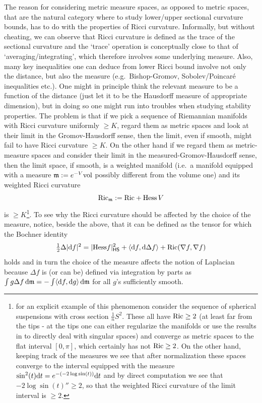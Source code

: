 \documentclass[11pt]{article}
\numberwithin{equation}{section}
\newcommand{\mm}{{\mathfrak m}}
\newcommand{\vol}{{\rm vol}}								%
\renewcommand{\d}{{\rm d}}
\newcommand{\Hess}{{\rm Hess}}
\newcommand\la{\langle}
\newcommand\ra{\rangle}
\newcommand{\HS}{\sf HS}
\newcommand{\Ric}{{\rm Ric}}
\begin{document}
The reason for considering metric measure spaces, as opposed to  metric spaces, that are the natural category where to study lower/upper sectional curvature bounds, has to do with the properties of Ricci curvature. Informally, but without cheating, we can observe that Ricci curvature is defined as the trace of the sectional curvature and the `trace' operation is conceptually close to that of `averaging/integrating', which therefore involves some underlying measure. Also, many key inequalities one can deduce from lower Ricci bound involve not only the distance, but also the measure (e.g.\ Bishop-Gromov, Sobolev/Poincar\'e inequalities etc.). One might in principle think the relevant measure to be a function of the distance (just let it to be the Hausdorff measure of appropriate dimension), but in doing so one might run into troubles when studying stability properties. The problem is that if we pick a sequence of Riemannian manifolds with Ricci curvature uniformly $\geq K$, regard them as metric spaces and look at their limit in the Gromov-Hausdorff sense, then the limit, even if smooth, might fail to have Ricci curvature  $\geq K$. On the other hand if we regard them as metric-measure spaces and consider their limit in the measured-Gromov-Hausdorff sense, then the limit space, if smooth, is a weighted manifold (i.e.\ a manifold equipped with a measure $\mm:=e^{-V}\vol$ possibly different from the volume one) and its weighted Ricci curvature
\begin{equation}
\label{eq:BEricci}
\Ric_\mm:=\Ric+\Hess\, V
\end{equation}
is  $\geq K$\footnote{for an explicit example of this phenomenon consider the sequence of spherical suspensions with cross section $\tfrac1n S^2$. These all have $\Ric\geq 2$ (at least far from the tips - at the tips one can either regularize the manifolds or use the results in \cite{Ketterer13} to directly deal with singular spaces) and converge as metric spaces to the flat interval $[0,\pi]$, which certainly has not $\Ric\geq 2$. On the other hand, keeping track of the measures we see that after normalization these spaces converge to the interval equipped with the measure   $\sin^2(t)\d t=e^{-(-2\log\sin(t))}\d t$ and by direct computation we see that $-2\log\sin(t)''\geq 2$, so that the weighted Ricci curvature of the limit interval is $\geq 2$.}. To see why the Ricci curvature should be affected by the choice of the measure, notice, beside the above, that it can be defined as the tensor for which the Bochner identity
\[
\tfrac12\Delta {|\d f|^2}=|\Hess f|^2_{\HS}+\la\d f,\d\Delta f\ra+\Ric(\nabla f,\nabla f)
\]
holds and in turn the choice of the measure affects the notion of Laplacian because $\Delta f$ is (or can be) defined via integration by parts as $\int g\Delta f\,\d\mm=-\int\la\d f,\d g\ra\,\d\mm$ for all $g$'s sufficiently smooth.
\end{document}
